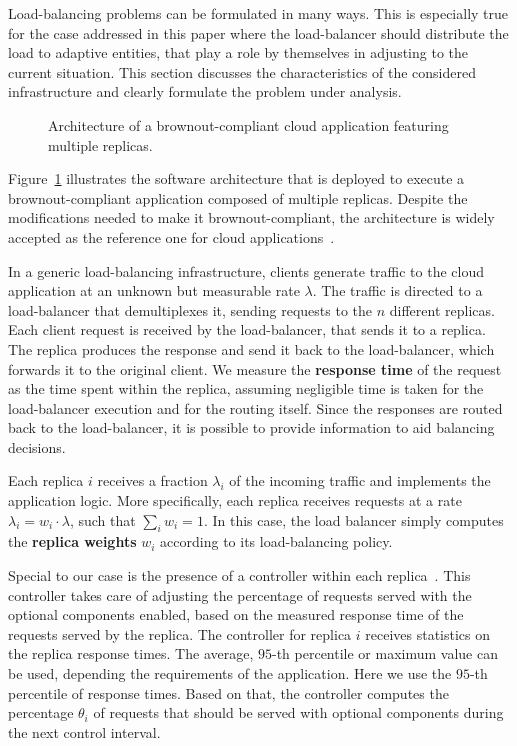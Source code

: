Load-balancing problems can be formulated in many ways. This is
especially true for the case addressed in this paper where the
load-balancer should distribute the load to adaptive entities, that
play a role by themselves in adjusting to the current situation. This
section discusses the characteristics of the considered infrastructure
and clearly formulate the problem under analysis.

\begin{figure}[t]
  \centering 
   
  \caption{Architecture of a brownout-compliant cloud application
    featuring multiple replicas.}
    \vspace{-6mm}
  \label{fig:architecture}
\end{figure}

Figure~\ref{fig:architecture} illustrates the software architecture
that is deployed to execute a brownout-compliant application composed
of multiple replicas. Despite the modifications needed to make it
brownout-compliant, the architecture is widely accepted as the
reference one for cloud applications~\citep{Barroso09}.

In a generic load-balancing infrastructure, clients generate traffic
to the cloud application at an unknown but measurable rate
$\lambda$. The traffic is directed to a load-balancer that demultiplexes it,
sending requests to the $n$ different replicas. Each client request is
received by the load-balancer, that sends it to a replica. The replica
produces the response and send it back to the load-balancer, which
forwards it to the original client. We measure the \textbf{response
  time} of the request as the time spent within the replica, assuming
negligible time is taken for the load-balancer execution and for the
routing itself. Since the responses are routed back to the
load-balancer, it is possible to provide information to aid balancing
decisions.

Each replica $i$ receives a fraction $\lambda_i$ of the incoming
traffic and implements the application logic. More specifically, each
replica receives requests at a rate $\lambda_i = w_i \cdot \lambda$,
such that $\sum_{i} w_i = 1$. In this case, the load balancer simply
computes the \textbf{replica weights} $w_i$ according to its
load-balancing policy.

Special to our case is the presence of a controller within each
replica~\cite{cloudish-tr}. This controller takes care of adjusting
the percentage of requests served with the optional components enabled,
based on the measured response time of the requests served by the
replica. The controller for replica $i$ receives statistics on the
replica response times. The average, $95$-th percentile or maximum value can be used, 
depending the requirements of the application.
Here we use the $95$-th percentile of
response times. Based on that, the controller computes the percentage 
$\theta_i$ of requests that should be served with optional components 
during the next control interval.

